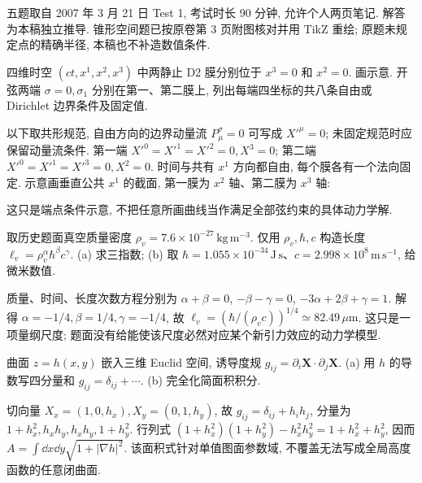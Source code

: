 五题取自 2007 年 3 月 21 日 Test 1, 考试时长 90 分钟, 允许个人两页笔记. 解答为本稿独立推导. 锥形空间题已按原卷第 3 页附图核对并用 TikZ 重绘; 原题未规定点的精确半径, 本稿也不补造数值条件.

\begin{exercise}
四维时空 $(ct,x^1,x^2,x^3)$ 中两静止 D2 膜分别位于 $x^3=0$ 和 $x^2=0$. 画示意. 开弦两端 $\sigma=0,\sigma_1$ 分别在第一、第二膜上, 列出每端四坐标的共八条自由或 Dirichlet 边界条件及固定值.
\end{exercise}
\begin{solution}
以下取共形规范, 自由方向的边界动量流 $P^\sigma_\mu=0$ 可写成 $X'^\mu=0$; 未固定规范时应保留动量流条件. 第一端 $X'^0=X'^1=X'^2=0,X^3=0$; 第二端 $X'^0=X'^1=X'^3=0,X^2=0$. 时间与共有 $x^1$ 方向都自由, 每个膜各有一个法向固定. 示意画垂直公共 $x^1$ 的截面, 第一膜为 $x^2$ 轴、第二膜为 $x^3$ 轴:
\begin{center}\end{center}
这只是端点条件示意, 不把任意所画曲线当作满足全部弦约束的具体动力学解.
\end{solution}

\begin{exercise}
取历史题面真空质量密度 $\rho_v=7.6\times10^{-27}\,\mathrm{kg\,m^{-3}}$. 仅用 $\rho_v,\hbar,c$ 构造长度 $\ell_v=\rho_v^\alpha\hbar^\beta c^\gamma$.
(a) 求三指数; (b) 取 $\hbar=1.055\times10^{-34}\,\mathrm{J\,s}$、$c=2.998\times10^8\,\mathrm{m\,s^{-1}}$, 给微米数值.
\end{exercise}
\begin{solution}
质量、时间、长度次数方程分别为 $\alpha+\beta=0$, $-\beta-\gamma=0$, $-3\alpha+2\beta+\gamma=1$. 解得 $\alpha=-1/4,\beta=1/4,\gamma=-1/4$, 故 $\ell_v=(\hbar/(\rho_vc))^{1/4}\simeq82.49\,\mu\mathrm m$. 这只是一项量纲尺度; 题面没有给能使该尺度必然对应某个新引力效应的动力学模型.
\end{solution}

\begin{exercise}
曲面 $z=h(x,y)$ 嵌入三维 Euclid 空间, 诱导度规 $g_{ij}=\partial_i\boldsymbol X\cdot\partial_j\boldsymbol X$.
(a) 用 $h$ 的导数写四分量和 $g_{ij}=\delta_{ij}+\cdots$.
(b) 完全化简面积积分.
\end{exercise}
\begin{solution}
切向量 $X_x=(1,0,h_x),X_y=(0,1,h_y)$, 故 $g_{ij}=\delta_{ij}+h_ih_j$, 分量为 $1+h_x^2,h_xh_y,h_xh_y,1+h_y^2$. 行列式 $(1+h_x^2)(1+h_y^2)-h_x^2h_y^2=1+h_x^2+h_y^2$, 因而 $A=\int\dd x\dd y\sqrt{1+|\nabla h|^2}$. 该面积式针对单值图面参数域, 不覆盖无法写成全局高度函数的任意闭曲面.
\end{solution}

